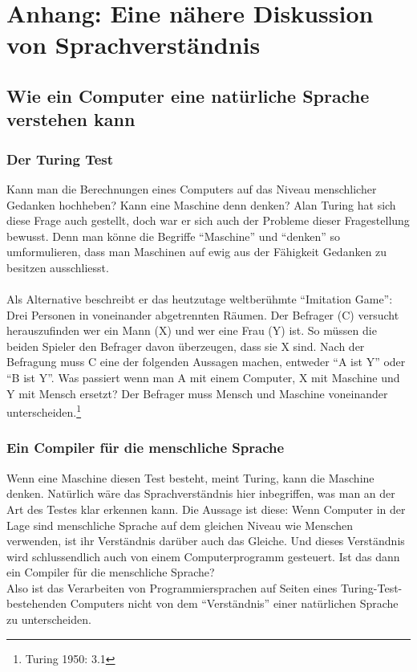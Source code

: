 \documentclass[10pt,a4paper]{article}
\begin{document}
\newpage
\renewcommand\thesection{\roman{section}}
\setcounter{section}{0}


\section{Anhang: Eine nähere Diskussion von Sprachverständnis}

\subsection{Wie ein Computer eine natürliche Sprache verstehen kann}
\subsubsection{Der Turing Test}
Kann man die Berechnungen eines Computers auf das Niveau menschlicher Gedanken hochheben? Kann eine Maschine denn denken? Alan Turing hat sich diese Frage auch gestellt, doch war er sich auch der Probleme dieser Fragestellung bewusst. Denn man könne die Begriffe \enquote{Maschine} und \enquote{denken} so umformulieren, dass man Maschinen auf ewig aus der Fähigkeit Gedanken zu besitzen ausschliesst.\\
\\
Als Alternative beschreibt er das heutzutage weltberühmte \enquote{Imitation Game}:
Drei Personen in voneinander abgetrennten Räumen. Der Befrager (C) versucht herauszufinden wer ein Mann (X) und wer eine Frau (Y) ist. So müssen die beiden Spieler den Befrager davon überzeugen, dass sie X sind. Nach der Befragung muss C eine der folgenden Aussagen machen, entweder \enquote{A ist Y} oder \enquote{B ist Y}. Was passiert wenn man A mit einem Computer, X mit Maschine und Y mit Mensch ersetzt? Der Befrager muss Mensch und Maschine voneinander unterscheiden.\footnote{Turing 1950: 3.1} \\

\subsubsection{Ein Compiler für die menschliche Sprache}
Wenn eine Maschine diesen Test besteht, meint Turing, kann die Maschine denken. Natürlich wäre das Sprachverständnis hier inbegriffen, was man an der Art des Testes klar erkennen kann. Die Aussage ist diese: Wenn Computer in der Lage sind menschliche Sprache auf dem gleichen Niveau wie Menschen verwenden, ist ihr Verständnis darüber auch das Gleiche. Und dieses Verständnis wird schlussendlich auch von einem Computerprogramm gesteuert. Ist das dann ein Compiler für die menschliche Sprache? \\
Also ist das Verarbeiten von Programmiersprachen auf Seiten eines Turing-Test-bestehenden Computers nicht von dem \enquote{Verständnis} einer natürlichen Sprache zu unterscheiden. \\
\end{document}
